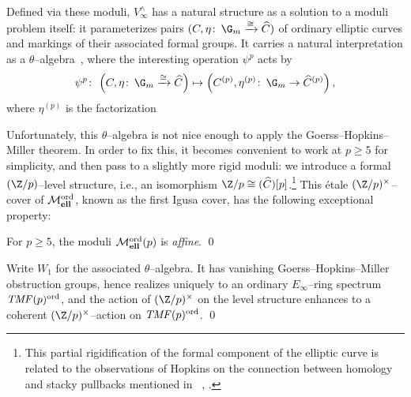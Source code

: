 \noindent Defined via these moduli, \(V^\wedge_\infty\) has a natural structure as a solution to a moduli problem itself: it parameterizes pairs \((C, \eta\co \G_m \xrightarrow{\cong} \widehat C)\) of ordinary elliptic curves and markings of their associated formal groups.  It carries a natural interpretation as a \(\theta\)--algebra~\cite[Equation 5.3]{BehrensConstruction}, where the interesting operation \(\psi^p\) acts by
\[
\psi^p\co \left(C, \eta\co \G_m \xrightarrow\cong \widehat C\right) \mapsto \left(C^{(p)}, \eta^{(p)}\co \G_m \to \widehat C^{(p)}\right),\]
where \(\eta^{(p)}\) is the factorization
\begin{center}
\end{center}
Unfortunately, this \(\theta\)--algebra is not nice enough to apply the Goerss--Hopkins--Miller theorem.  In order to fix this, it becomes convenient to work at \(p \ge 5\) for simplicity, and then pass to a slightly more rigid moduli: we introduce a formal \((\Z/p)\)--level structure, i.e., an isomorphism \(\Z/p \cong (\widehat C)[p]\).\footnote{This partial rigidification of the formal component of the elliptic curve is related to the observations of Hopkins on the connection between homology and stacky pullbacks mentioned in ~\cite[Section 3.1]{HopkinsFromSpectraToStacks}, \cite[Section 12]{Rezk512Notes}.}  This \'etale \((\Z/p)^\times\)--cover of \(\mathcal{M}_{\mathbf{ell}}^{\mathrm{ord}}\), known as the first Igusa cover, has the following exceptional property:

\begin{lemma}
For \(p \ge 5\), the moduli \(\mathcal{M}_{\mathbf{ell}}^{\mathrm{ord}}(p)\) is \emph{affine}. \qed
\end{lemma}

\begin{corollary}
Write \(W_1\) for the associated \(\theta\)--algebra.  It has vanishing Goerss--Hopkins--Miller obstruction groups, hence realizes uniquely to an ordinary \(E_\infty\)--ring spectrum \(\mathit{TMF}(p)^{\mathrm{ord}}\), and the action of \((\Z/p)^\times\) on the level structure enhances to a coherent \((\Z/p)^\times\)--action on \(\mathit{TMF}(p)^{\mathrm{ord}}\). \qed
\end{corollary}

